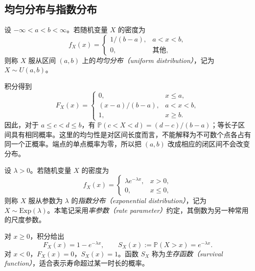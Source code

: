 \subsection{均匀分布与指数分布}
\label{subsec:study-uniform-exponential}

\begin{definition}
\label{def:study-continuous-uniform}
设 $-\infty<a<b<\infty$。若随机变量 $X$ 的密度为
\begin{equation}
  f_X(x)=\begin{cases}
    1/(b-a),&a<x<b,\\
    0,&\text{其他},
  \end{cases}
  \label{eq:study-uniform-density}
\end{equation}
则称 $X$ 服从区间 $(a,b)$ 上的\emph{均匀分布（uniform distribution）}，记为 $X\sim U(a,b)$。
\end{definition}

积分得到
\begin{equation}
  F_X(x)=\begin{cases}
    0,&x\le a,\\
    (x-a)/(b-a),&a<x<b,\\
    1,&x\ge b.
  \end{cases}
  \label{eq:study-uniform-cdf}
\end{equation}
因此，对于 $a\le c<d\le b$，有 $\mathbb P(c<X<d)=(d-c)/(b-a)$；等长子区间具有相同概率。这里的均匀性是对区间长度而言，不能解释为不可数个点各占有同一个正概率。端点的单点概率为零，所以把 $(a,b)$ 改成相应的闭区间不会改变分布。

\begin{definition}
\label{def:study-exponential}
设 $\lambda>0$。若随机变量 $X$ 的密度为
\begin{equation}
  f_X(x)=\begin{cases}
    \lambda e^{-\lambda x},&x>0,\\
    0,&x\le0,
  \end{cases}
  \label{eq:study-exponential-density}
\end{equation}
则称 $X$ 服从参数为 $\lambda$ 的\emph{指数分布（exponential distribution）}，记为 $X\sim\mathrm{Exp}(\lambda)$。本笔记采用\emph{率参数（rate parameter）}约定，其倒数为另一种常用的尺度参数。
\end{definition}

对 $x\ge0$，积分给出
\begin{equation}
  F_X(x)=1-e^{-\lambda x},\qquad
  S_X(x):=\mathbb P(X>x)=e^{-\lambda x}.
  \label{eq:study-exponential-cdf-tail}
\end{equation}
对 $x<0$，$F_X(x)=0$，$S_X(x)=1$。函数 $S_X$ 称为\emph{生存函数（survival function）}，适合表示寿命超过某一时长的概率。

